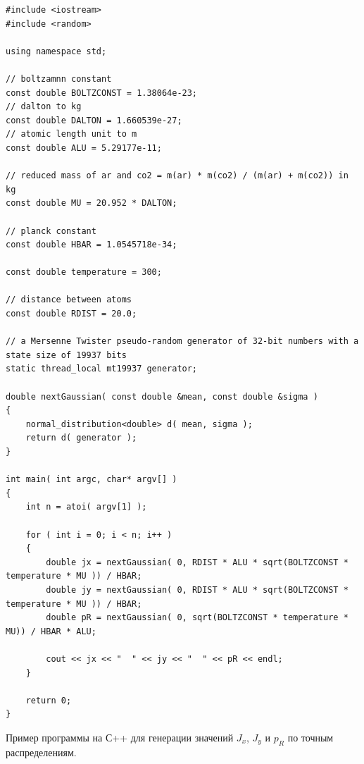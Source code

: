 \begin{lstlisting}
#include <iostream>
#include <random>

using namespace std;

// boltzamnn constant 
const double BOLTZCONST = 1.38064e-23;
// dalton to kg 
const double DALTON = 1.660539e-27;
// atomic length unit to m 
const double ALU = 5.29177e-11;

// reduced mass of ar and co2 = m(ar) * m(co2) / (m(ar) + m(co2)) in kg
const double MU = 20.952 * DALTON;

// planck constant 
const double HBAR = 1.0545718e-34;

const double temperature = 300;

// distance between atoms 
const double RDIST = 20.0;

// a Mersenne Twister pseudo-random generator of 32-bit numbers with a state size of 19937 bits
static thread_local mt19937 generator;
 
double nextGaussian( const double &mean, const double &sigma )
{
    normal_distribution<double> d( mean, sigma );
    return d( generator ); 
} 

int main( int argc, char* argv[] )
{
	int n = atoi( argv[1] );

	for ( int i = 0; i < n; i++ )
	{
		double jx = nextGaussian( 0, RDIST * ALU * sqrt(BOLTZCONST * temperature * MU )) / HBAR;
		double jy = nextGaussian( 0, RDIST * ALU * sqrt(BOLTZCONST * temperature * MU )) / HBAR;
		double pR = nextGaussian( 0, sqrt(BOLTZCONST * temperature * MU)) / HBAR * ALU;

		cout << jx << "  " << jy << "  " << pR << endl;
	}

	return 0;
}
\end{lstlisting}

Пример программы на С++ для генерации значений $J_x$, $J_y$ и $p_R$ по точным распределениям.

